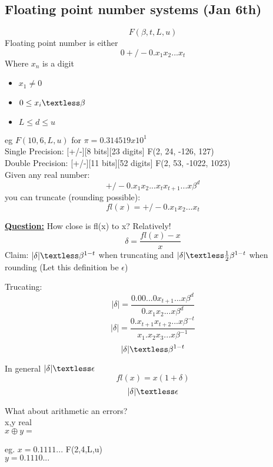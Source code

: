 \documentclass[12pt]{article}
\newcommand{\myt}[1]{\textbf{\underline{#1}}}
\begin{document}
	\subsection*{Floating point number systems (Jan 6th)}
	
	$$F(\beta , t, L, u)$$
	Floating point number is either\\
	$$0 +/- 0.x_1x_2...x_t$$
	Where $x_n$ is a digit\\
	\begin{itemize}
		\item $x_1 \ne 0$
		\item $0 \le x_i \textless\beta$
		\item $L \le d \le u$
	\end{itemize}
	
	eg $F(10, 6, L, u)$ for $\pi = 0.314519 x 10^1$\\
	
	Single Precision: [+/-][8 bits][23 digits] F(2, 24, -126, 127)\\
	Double Precision: [+/-][11 bits][52 digits] F(2, 53, -1022, 1023)\\
	
	Given any real number:
	$$+/- 0.x_1x_2...x_tx_{t+1}...x\beta ^d$$
	you can truncate (rounding possible):
	$$fl(x) = +/- 0.x_1x_2...x_t$$
	
	\myt{Question:} How close is fl(x) to x? Relatively!\\
	
	$$\delta = \frac{fl(x) - x}{x}$$
	Claim: $|\delta| \textless \beta^{1-t}$ when truncating and $|\delta| \textless \frac{1}{2}\beta^{1-t}$ when rounding (Let this definition be $\epsilon$)
	
	Trucating:
	$$|\delta| = \frac{0.00...0x_{t+1}...x\beta^d}{0.x_1x_2...x\beta^d}$$
	$$|\delta| = \frac{0.x_{t+1}x_{t+2}...x\beta^{-t}}{x_1.x_2x_3...x\beta^{-1}}$$
	$$|\delta| \textless \beta^{1-t}$$
	
	In general $|\delta| \textless \epsilon$\\
	
	$$fl(x) = x(1 + \delta)$$
	$$|\delta| \textless \epsilon$$
	
	What about arithmetic an errors?\\
	
	x,y real\\
	$x \oplus y = $
	
	eg.
	$x = 0.1111...$ F(2,4,L,u)\\
	$y = 0.1110...$\\
	
\end{document}

